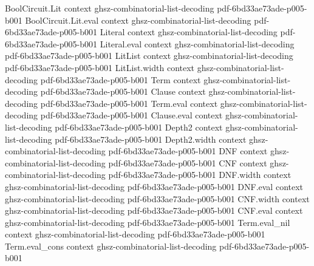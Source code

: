 \begin{lemma}
\label{BoolFourier.fourier_coeff_char_of_ne}
\leanok
{}
\proofstep
  {BoolCircuit.Lit}
  {context}
  {ghsz-combinatorial-list-decoding}
  {pdf-6bd33ae73ade-p005-b001}
\proofstep
  {BoolCircuit.Lit.eval}
  {context}
  {ghsz-combinatorial-list-decoding}
  {pdf-6bd33ae73ade-p005-b001}
\proofstep
  {Literal}
  {context}
  {ghsz-combinatorial-list-decoding}
  {pdf-6bd33ae73ade-p005-b001}
\proofstep
  {Literal.eval}
  {context}
  {ghsz-combinatorial-list-decoding}
  {pdf-6bd33ae73ade-p005-b001}
\proofstep
  {LitList}
  {context}
  {ghsz-combinatorial-list-decoding}
  {pdf-6bd33ae73ade-p005-b001}
\proofstep
  {LitList.width}
  {context}
  {ghsz-combinatorial-list-decoding}
  {pdf-6bd33ae73ade-p005-b001}
\proofstep
  {Term}
  {context}
  {ghsz-combinatorial-list-decoding}
  {pdf-6bd33ae73ade-p005-b001}
\proofstep
  {Clause}
  {context}
  {ghsz-combinatorial-list-decoding}
  {pdf-6bd33ae73ade-p005-b001}
\proofstep
  {Term.eval}
  {context}
  {ghsz-combinatorial-list-decoding}
  {pdf-6bd33ae73ade-p005-b001}
\proofstep
  {Clause.eval}
  {context}
  {ghsz-combinatorial-list-decoding}
  {pdf-6bd33ae73ade-p005-b001}
\proofstep
  {Depth2}
  {context}
  {ghsz-combinatorial-list-decoding}
  {pdf-6bd33ae73ade-p005-b001}
\proofstep
  {Depth2.width}
  {context}
  {ghsz-combinatorial-list-decoding}
  {pdf-6bd33ae73ade-p005-b001}
\proofstep
  {DNF}
  {context}
  {ghsz-combinatorial-list-decoding}
  {pdf-6bd33ae73ade-p005-b001}
\proofstep
  {CNF}
  {context}
  {ghsz-combinatorial-list-decoding}
  {pdf-6bd33ae73ade-p005-b001}
\proofstep
  {DNF.width}
  {context}
  {ghsz-combinatorial-list-decoding}
  {pdf-6bd33ae73ade-p005-b001}
\proofstep
  {DNF.eval}
  {context}
  {ghsz-combinatorial-list-decoding}
  {pdf-6bd33ae73ade-p005-b001}
\proofstep
  {CNF.width}
  {context}
  {ghsz-combinatorial-list-decoding}
  {pdf-6bd33ae73ade-p005-b001}
\proofstep
  {CNF.eval}
  {context}
  {ghsz-combinatorial-list-decoding}
  {pdf-6bd33ae73ade-p005-b001}
\proofstep
  {Term.eval_nil}
  {context}
  {ghsz-combinatorial-list-decoding}
  {pdf-6bd33ae73ade-p005-b001}
\proofstep
  {Term.eval_cons}
  {context}
  {ghsz-combinatorial-list-decoding}
  {pdf-6bd33ae73ade-p005-b001}
\proofstep

\end{lemma}
